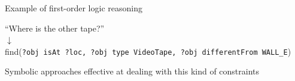 \documentclass[compress,xcolor=table]{beamer}
\begin{document}

\begin{frame}{Example of first-order logic reasoning}
    \centering

    \vspace*{2em}
    ``Where is the other tape?''\\
    $\downarrow$\\
    find({\tt\scriptsize ?obj isAt ?loc, ?obj type VideoTape, ?obj differentFrom WALL\_E})

    \pause

    \vspace*{2em}
    Symbolic approaches effective at dealing with this kind of constraints

\end{frame}
\end{document}
